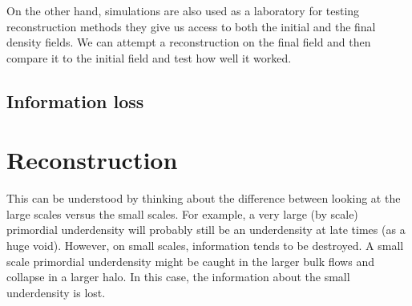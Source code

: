 On the other hand, simulations are also used as a laboratory for testing reconstruction methods they give us access to both the initial and the final density fields. We can attempt a reconstruction on the final field and then compare it to the initial field and test how well it worked. 

\subsection{Information loss}





\section{Reconstruction}

This can be understood by thinking about the difference between looking at the large scales versus the small scales. For example, a very large (by scale) primordial underdensity will probably still be an underdensity at late times (as a huge void). However, on small scales, information tends to be destroyed. A small scale primordial underdensity might be caught in the larger bulk flows and collapse in a larger halo. In this case, the information about the small underdensity is lost. 




    
